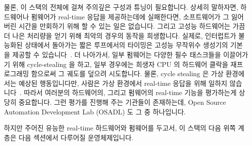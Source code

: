 물론, 이 스택의 전체에 걸쳐 주의깊은 구성과 튜닝이 필요합니다.
상세히 말하자면, 하드웨어나 펌웨어가 real-time 응답을 제공하는데에 실패한다면,
소프트웨어가 그 잃어버린 시간을 만회하기 위해 할 수 있는 일은 없습니다.
그리고 고성능 하드웨어는 가끔 더 나은 처리량을 얻기 위해 최악의 경우의 동작을
희생합니다.
실제로, 인터럽트가 불능화된 상태에서 돌아가는 짧은 루프에서의 타이밍은 고성능
무작위수 생성기의 기본을 제공할 수
있습니다~\cite{PeterOkech2009InherentRandomness}.
더 나아가서, 일부 펌웨어는 다양한 필수 태스크들을 이끌어가기 위해
cycle-stealing 을 하고, 일부 경우에는 희생자 CPU 의 하드웨어 클락을
재프로그래밍 함으로써 그 궤도를 덮으려 시도합니다.
물론, cycle stealing 은 가상 환경에서는 예상된 행동입니다만, 사람은 가상
환경에서 real-time 응답을 위해 일하지
않습니다~\cite{ThomasGleixner2012KVMrealtime,JanKiszka2014virtRT}.
따라서 여러분의 하드웨어의, 그리고 펌웨어의 real-time 기능을 평가하는게 상당히
중요합니다.
그런 평가를 진행해 주는 기관들이 존재하는데, Open Source Automation Development
Lab (OSADL) 도 그 중 하나입니다.

하지만 주어진 유능한 real-time 하드웨어와 펌웨어를 두고서, 이 스택의 다음 위쪽
계층은 다음 섹션에서 다루어질 운영체제입니다.

